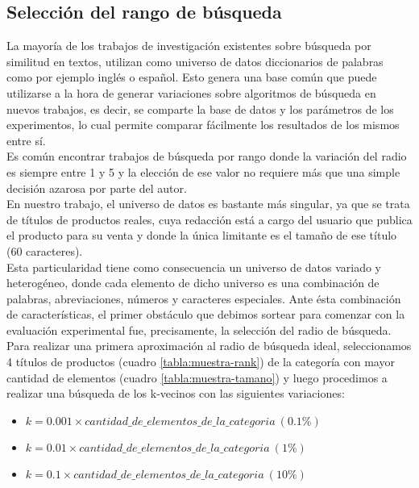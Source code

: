 \subsection{Selecci\'on del rango de b\'usqueda}

La mayor\'ia de los trabajos de investigaci\'on existentes sobre b\'usqueda por similitud en textos, utilizan como universo de datos diccionarios de palabras como por ejemplo ingl\'es o español. Esto genera una base com\'un que puede utilizarse a la hora de generar variaciones sobre algoritmos de b\'usqueda en nuevos trabajos, es decir, se comparte la base de datos y los par\'ametros de los experimentos, lo cual permite comparar f\'acilmente los resultados de los mismos entre s\'i.\\
 
Es com\'un encontrar trabajos de b\'usqueda por rango donde la variaci\'on del radio es siempre entre 1 y 5 y la elecci\'on de ese valor no requiere m\'as que una simple decisi\'on azarosa por parte del autor.\\

En nuestro trabajo, el universo de datos es bastante m\'as singular, ya que se trata de t\'itulos de productos reales, cuya redacci\'on est\'a a cargo del usuario que publica el producto para su venta y donde la \'unica limitante es el tama\~no de ese t\'itulo (60 caracteres).\\

Esta particularidad tiene como consecuencia un universo de datos variado y heterog\'eneo, donde cada elemento de dicho universo es una combinaci\'on de palabras, abreviaciones, n\'umeros y caracteres especiales. Ante \'esta combinaci\'on de caracter\'isticas, el primer obst\'aculo que debimos sortear para comenzar con la evaluaci\'on experimental fue, precisamente, la selecci\'on del radio de b\'usqueda.\\

Para realizar una primera aproximaci\'on al radio de b\'usqueda ideal, seleccionamos 4 t\'itulos de productos (cuadro \ref{tabla:muestra-rank}) de la categor\'ia con mayor cantidad de elementos (cuadro \ref{tabla:muestra-tamano}) y luego procedimos a realizar una b\'usqueda de los k-vecinos con las siguientes variaciones:\\

\begin{itemize}
\item $k= 0.001 \times  cantidad\_de\_elementos\_de\_la\_categoria\ (0.1\%)$
\item $k= 0.01 \times cantidad\_de\_elementos\_de\_la\_categoria\ (1\%)$
\item $k= 0.1 \times cantidad\_de\_elementos\_de\_la\_categoria\ (10\%)$
\end{itemize}

